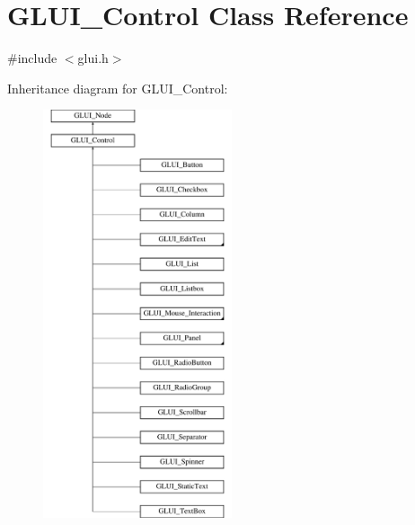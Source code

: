 \hypertarget{classGLUI__Control}{\section{G\-L\-U\-I\-\_\-\-Control Class Reference}
\label{classGLUI__Control}
}


{\ttfamily \#include $<$glui.\-h$>$}

Inheritance diagram for G\-L\-U\-I\-\_\-\-Control\-:\begin{figure}[H]
\begin{center}
\leavevmode
\includegraphics[height=12.000000cm]{classGLUI__Control}
\end{center}
\end{figure}
